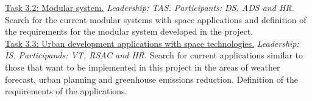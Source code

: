 \begin{table}[H]
\begin{tabular}
{{		\underline{Task 3.2: Modular system.} \textit{Leadership: TAS. Participants: DS, ADS and HR.} Search for the current modular systems with space applications and definition of the requirements for the modular system developed in the project.\\
		
		\underline{Task 3.3: Urban development applications with space technologies.} \textit{Leadership: IS. Participands: VT, RSAC and HR.} Search for current applications similar to those
that want to be implemented in this project in the areas of weather forecast, urban planning and greenhouse emissions reduction. Definition of the requirements of the applications.
		 }}\\
		 \hline 
		 
		 \\
		 
		 \hline 
		 
		\end{tabular}
		
		\caption{WP3 description}
		
\end{table}



